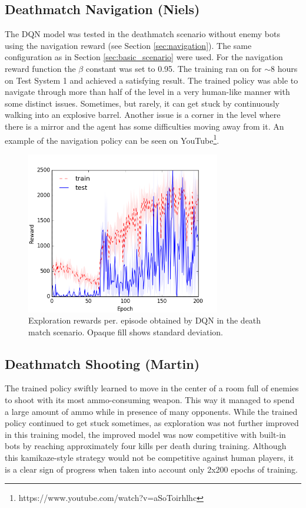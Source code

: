 \documentclass{article}
\begin{document}
\subsection{Deathmatch Navigation (Niels)}
The DQN model was tested in the deathmatch scenario without enemy bots using the navigation reward (see Section \ref{sec:navigation}). The same configuration as in Section \ref{sec:basic_scenario} were used. For the navigation reward function the $\beta$ constant was set to 0.95. The training ran on for $\sim$8 hours on Test System 1 and achieved a satisfying result. The trained policy was able to navigate through more than half of the level in a very human-like manner with some distinct issues. Sometimes, but rarely, it can get stuck by continuously walking into an explosive barrel. Another issue is a corner in the level where there is a mirror and the agent has some difficulties moving away from it. An example of the navigation policy can be seen on YouTube\footnote{https://www.youtube.com/watch?v=aSoToirhlhc}.

\begin{figure}[htb]

\begin{minipage}[b]{1.0\linewidth}
  \centering
  \centerline{\includegraphics[width=8.5cm]{exploration}}
\end{minipage}
\caption{Exploration rewards per. episode obtained by DQN in the death match scenario. Opaque fill shows standard deviation.}
\label{fig:res}
%
\end{figure}

\subsection{Deathmatch Shooting (Martin)}
The trained policy swiftly learned to move in the center of a room full of enemies to shoot with its most ammo-consuming weapon. This way it managed to spend a large amount of ammo while in presence of many opponents. While the trained policy continued to get stuck sometimes, as exploration was not further improved in this training model, the improved model was now competitive with built-in bots by reaching approximately four kills per death during training. Although this kamikaze-style strategy would not be competitive against human players, it is a clear sign of progress when taken into account only 2x200 epochs of training.
\end{document}
